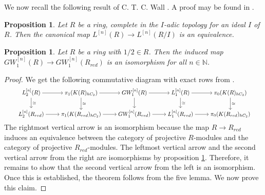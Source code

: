 \documentclass[11pt,a4paper]{amsart}
\theoremstyle{plain}
\newtheorem{prop}[thm]{Proposition}
\theoremstyle{definition}
\theoremstyle{remark}
\begin{document}
We now recall the following result of C. T. C. Wall \cite[Lemma 5]{wall1973classification}. A proof may be found in \cite[Proposition 2.3.7]{calmes2026hermitian}.
\begin{prop}\label{Ltheoryiso}
  Let $R$ be a ring, complete in the $I$-adic topology for an ideal $I$ of $R$. Then the canonical
map $L^{[n]}(R)\rightarrow L^{[n]}(R/I)$ is an equivalence.
\end{prop}
\begin{prop}\label{reducedgw1}
    Let $R$ be a ring with $1/2\in R$. Then the induced map $GW^{[n]}_1(R)\rightarrow GW^{[n]}_1{(R_{red})}$ is an isomorphism for all $n\in \mathbb{N}$.
\end{prop}
 
\begin{proof}
  We get the following commutative diagram with exact rows from \cite[Theorem 7.6]{schlichting2017hermitian}.
    \[
    \scalebox{0.8}{
    \begin{tikzcd}[ampersand replacement=\&,cramped]
	{L^{[n]}_2(R)} \& {\pi_1(K(R)_{hC_2})} \& {GW^{[n]}_1(R)} \& {L^{[n]}_1(R)} \& {\pi_0(K(R)_{hC_2})} \\
	{L^{[n]}_2(R_{red})} \& {\pi_1(K(R_{red})_{hC_2})} \& {GW^{[n]}_1(R_{red})} \& {L^{[n]}_1(R_{red})} \& {\pi_0(K(R_{red})_{hC_2})}
	\arrow[from=1-1, to=1-2]
	\arrow["\simeq", from=1-1, to=2-1]
	\arrow[from=1-2, to=1-3]
	\arrow["\simeq", from=1-2, to=2-2]
	\arrow[from=1-3, to=1-4]
	\arrow[from=1-3, to=2-3]
	\arrow[from=1-4, to=1-5]
	\arrow["\simeq", from=1-4, to=2-4]
	\arrow["\simeq", from=1-5, to=2-5]
	\arrow[from=2-1, to=2-2]
	\arrow[from=2-2, to=2-3]
	\arrow[from=2-3, to=2-4]
	\arrow[from=2-4, to=2-5]
\end{tikzcd}}\]
The rightmost vertical arrow is an isomorphism because the map $R \rightarrow R_{red}$ induces an equivalence between the category of projective $R$-modules and the category of projective $R_{red}$-modules. The leftmost vertical arrow and the second vertical arrow from the right are isomorphisms by proposition \ref{Ltheoryiso}. Therefore, it remains to show that the second vertical arrow from the left is an isomorphism. Once this is established, the theorem follows from the five lemma.
We now prove this claim.



\end{proof}
\end{document}
